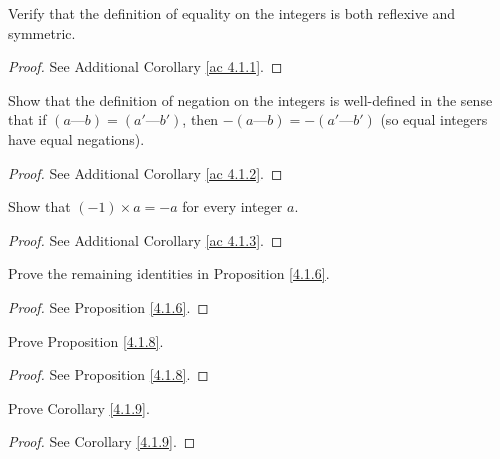 \exercisesection

\begin{exercise}\label{ex 4.1.1}
    Verify that the definition of equality on the integers is both reflexive and symmetric.
\end{exercise}

\begin{proof}
    See Additional Corollary \ref{ac 4.1.1}.
\end{proof}

\begin{exercise}\label{ex 4.1.2}
    Show that the definition of negation on the integers is well-defined in the sense that if \((a \text{---} b) = (a' \text{---} b')\), then \(-(a \text{---} b) = -(a' \text{---} b')\)
    (so equal integers have equal negations).
\end{exercise}

\begin{proof}
    See Additional Corollary \ref{ac 4.1.2}.
\end{proof}

\begin{exercise}\label{ex 4.1.3}
    Show that \((-1) \times a = -a\) for every integer \(a\).
\end{exercise}

\begin{proof}
    See Additional Corollary \ref{ac 4.1.3}.
\end{proof}

\begin{exercise}\label{ex 4.1.4}
    Prove the remaining identities in Proposition \ref{4.1.6}.
\end{exercise}

\begin{proof}
    See Proposition \ref{4.1.6}.
\end{proof}

\begin{exercise}\label{ex 4.1.5}
    Prove Proposition \ref{4.1.8}.
\end{exercise}

\begin{proof}
    See Proposition \ref{4.1.8}.
\end{proof}

\begin{exercise}\label{ex 4.1.6}
    Prove Corollary \ref{4.1.9}.
\end{exercise}

\begin{proof}
    See Corollary \ref{4.1.9}.
\end{proof}

